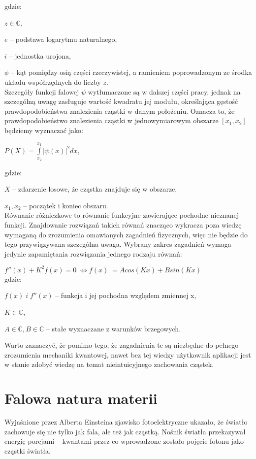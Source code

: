 \documentclass{SGGW-thesis}
\begin{document}
	gdzie:
	
	$z \in \mathbb{C}$,
	
	$e$ -- podstawa logarytmu naturalnego,
	
	$i$ -- jednostka urojona,
	
	$\phi$ -- kąt pomiędzy osią części rzeczywistej, a ramieniem poprowadzonym ze środka układu współrzędnych do liczby $z$.\\
	
	Szczegóły funkcji falowej $\psi$ wytłumaczone są w dalszej części pracy, jednak na szczególną uwagę zasługuje wartość kwadratu jej modułu, określająca gęstość prawdopodobieństwa znalezienia cząstki w danym położeniu. Oznacza to, że prawdopodobieństwo znalezienia cząstki w jednowymiarowym obszarze $[x_1, x_2]$ będziemy wyznaczać jako:
	\begin{center}
	 	$P(X) = \int\limits_{x_2}^{x_1} |\psi(x)|^2dx$,
	\end{center}
	
	gdzie:
	
	$X$ -- zdarzenie losowe, że cząstka znajduje się w obszarze,
	
	$x_1, x_2$ -- początek i koniec obszaru.\\ 	
	
	Równanie różniczkowe to równanie funkcyjne zawierające pochodne nieznanej funkcji. Znajdowanie rozwiązań takich równań znacząco wykracza poza wiedzę wymaganą do zrozumienia omawianych zagadnień fizycznych, więc nie będzie do tego przywiązywana szczególna uwaga. Wybrany zakres zagadnień wymaga jedynie zapamiętania rozwiązania jednego rodzaju równań:
	
	$f''(x)+K^2f(x)=0 \;\Longleftrightarrow f(x)\; = Acos(Kx) + Bsin(Kx)$ \\

	gdzie:
	
	$f(x) \; i \; f''(x)$ -- funkcja i jej pochodna względem zmiennej x,

	$K \in \mathbb{C}$,
		
	$A \in \mathbb{C}, B \in \mathbb{C}$ -- stałe wyznaczane z warunków brzegowych.
	
	

	Warto zaznaczyć, że pomimo tego, że zagadnienia te są niezbędne do pełnego zrozumienia mechaniki kwantowej, nawet bez tej wiedzy użytkownik aplikacji jest w stanie zdobyć wiedzę na temat nieintuicyjnego zachowania cząstek.
	\section{Falowa natura materii}
	Wyjaśnione przez Alberta Einsteina zjawisko fotoelektryczne ukazało, że światło zachowuje się nie tylko jak fala, ale też jak cząstką\cite{photo-ele}. Nośnik światła przekazywał energię porcjami -- kwantami przez co wprowadzone zostało pojęcie fotonu jako cząstki światła.
	
\end{document}
